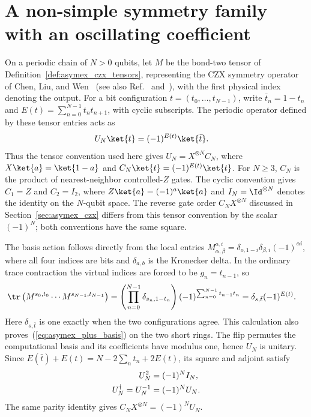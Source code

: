 \section{A non-simple symmetry family with an oscillating coefficient}%
\label{sec:asymex_czx_plus}

On a periodic chain of $N>0$ qubits, let $M$ be the bond-two tensor of
Definition~\ref{def:asymex_czx_tensors}, representing the CZX symmetry
operator of Chen, Liu, and Wen~\cite{ChenLiuWen2011CZX} (see also
Ref.~\cite[Appendix~A]{Cirac2021Matrix} and~\cite{GarreRubio2023MPOSym}),
with the first physical index denoting
the output. For a bit configuration
$t=(t_0,\ldots,t_{N-1})$, write $\bar t_n=1-t_n$ and
$E(t)=\sum_{n=0}^{N-1}t_nt_{n+1}$, with cyclic subscripts. The periodic
operator defined by these tensor entries acts as
\begin{align}
    U_N\ket{t} & =(-1)^{E(t)}\ket{\bar t}.
    \label{eq:asymex_plus_basis}
\end{align}
Thus the tensor convention used here gives $U_N=X^{\otimes N}C_N$,
where $X\ket{a}=\ket{1-a}$ and
$C_N\ket{t}=(-1)^{E(t)}\ket{t}$. For $N\geq3$, $C_N$ is the product of
nearest-neighbor controlled-$Z$ gates. The cyclic convention gives
$C_1=Z$ and $C_2=I_2$, where $Z\ket{a}=(-1)^a\ket{a}$ and
$I_N=\Id^{\otimes N}$ denotes the identity on the $N$-qubit space.
The reverse gate order $C_NX^{\otimes N}$ discussed in
Section~\ref{sec:asymex_czx} differs from this tensor convention by
the scalar $(-1)^N$; both conventions have the same square.

The basis action follows directly from the local entries
$M^{o,i}_{\alpha,\beta}
    =\delta_{o,1-i}\delta_{\beta,i}(-1)^{\alpha i}$, where all four indices
are bits and $\delta_{a,b}$ is the Kronecker delta.
In the ordinary trace contraction the virtual indices are forced to be
$g_n=t_{n-1}$, so
\begin{align}
    \tr\left(M^{s_0,t_0}\cdots M^{s_{N-1},t_{N-1}}\right)
     & =\left(\prod_{n=0}^{N-1}\delta_{s_n,1-t_n}\right)
    (-1)^{\sum_{n=0}^{N-1}t_{n-1}t_n}
    =\delta_{s,\bar t}(-1)^{E(t)}.
    \label{eq:asymex_plus_kernel}
\end{align}
Here $\delta_{s,\bar t}$ is one exactly when the two configurations
agree. This calculation also proves~(\ref{eq:asymex_plus_basis}) on
the two short rings. The flip permutes the computational basis and
its coefficients have modulus one, hence $U_N$ is unitary. Since
$E(\bar t)+E(t)=N-2\sum_n t_n+2E(t)$, its square and adjoint satisfy
\begin{align}
    U_N^2                & =(-1)^NI_N,
    \label{eq:asymex_plus_unitary}     \\
    U_N^\dagger=U_N^{-1} & =(-1)^NU_N.
    \notag
\end{align}
The same parity identity gives $C_NX^{\otimes N}=(-1)^NU_N$.

